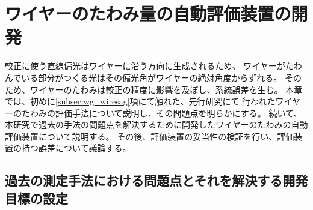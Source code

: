 \documentclass[../../main.tex]{subfiles}
\begin{document}
\chapter{ワイヤーのたわみ量の自動評価装置の開発}
\label{chap:wiresag}
較正に使う直線偏光はワイヤーに沿う方向に生成されるため、
ワイヤーがたわんでいる部分がつくる光はその偏光角がワイヤーの絶対角度からずれる。
そのため、ワイヤーのたわみは較正の精度に影響を及ぼし、系統誤差を生む。
本章では、初めに\ref{subsec:wg_wiresag}項にて触れた、先行研究\cite{swg:murata}\cite{swg:iijima}にて
行われたワイヤーのたわみの評価手法について説明し、その問題点を明らかにする。
続いて、本研究で過去の手法の問題点を解決するために開発したワイヤーのたわみの自動評価装置について説明する。
その後、評価装置の妥当性の検証を行い、評価装置の持つ誤差について議論する。

\section{過去の測定手法における問題点とそれを解決する開発目標の設定}
\end{document}
